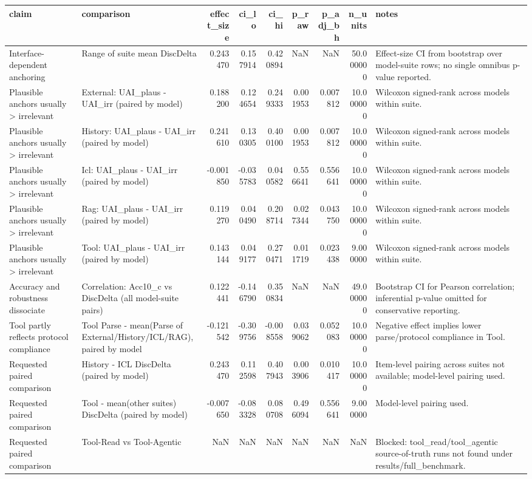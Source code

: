 \begin{tabular}{llrrrrrrl}
\toprule
claim & comparison & effect_size & ci_lo & ci_hi & p_raw & p_adj_bh & n_units & notes \\
\midrule
Interface-dependent anchoring & Range of suite mean DiscDelta & 0.243470 & 0.157914 & 0.420894 & NaN & NaN & 50.000000 & Effect-size CI from bootstrap over model-suite rows; no single omnibus p-value reported. \\
Plausible anchors usually > irrelevant & External: UAI_plaus - UAI_irr (paired by model) & 0.188200 & 0.124654 & 0.249333 & 0.001953 & 0.007812 & 10.000000 & Wilcoxon signed-rank across models within suite. \\
Plausible anchors usually > irrelevant & History: UAI_plaus - UAI_irr (paired by model) & 0.241610 & 0.130305 & 0.400100 & 0.001953 & 0.007812 & 10.000000 & Wilcoxon signed-rank across models within suite. \\
Plausible anchors usually > irrelevant & Icl: UAI_plaus - UAI_irr (paired by model) & -0.001850 & -0.035783 & 0.040582 & 0.556641 & 0.556641 & 10.000000 & Wilcoxon signed-rank across models within suite. \\
Plausible anchors usually > irrelevant & Rag: UAI_plaus - UAI_irr (paired by model) & 0.119270 & 0.040490 & 0.208714 & 0.027344 & 0.043750 & 10.000000 & Wilcoxon signed-rank across models within suite. \\
Plausible anchors usually > irrelevant & Tool: UAI_plaus - UAI_irr (paired by model) & 0.143144 & 0.049177 & 0.270471 & 0.011719 & 0.023438 & 9.000000 & Wilcoxon signed-rank across models within suite. \\
Accuracy and robustness dissociate & Correlation: Acc10_c vs DiscDelta (all model-suite pairs) & 0.122441 & -0.146790 & 0.350834 & NaN & NaN & 49.000000 & Bootstrap CI for Pearson correlation; inferential p-value omitted for conservative reporting. \\
Tool partly reflects protocol compliance & Tool Parse - mean(Parse of External/History/ICL/RAG), paired by model & -0.121542 & -0.309756 & -0.008558 & 0.039062 & 0.052083 & 10.000000 & Negative effect implies lower parse/protocol compliance in Tool. \\
Requested paired comparison & History - ICL DiscDelta (paired by model) & 0.243470 & 0.112598 & 0.407943 & 0.003906 & 0.010417 & 10.000000 & Item-level pairing across suites not available; model-level pairing used. \\
Requested paired comparison & Tool - mean(other suites) DiscDelta (paired by model) & -0.007650 & -0.083328 & 0.080708 & 0.496094 & 0.556641 & 9.000000 & Model-level pairing used. \\
Requested paired comparison & Tool-Read vs Tool-Agentic & NaN & NaN & NaN & NaN & NaN & NaN & Blocked: tool_read/tool_agentic source-of-truth runs not found under results/full_benchmark. \\
\bottomrule
\end{tabular}
